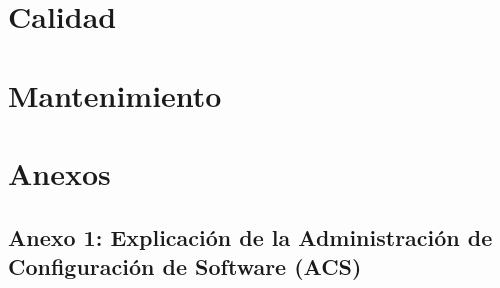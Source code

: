 \documentclass[a4paper,11pt]{report}
\begin{document}
    \chapter{Calidad}\label{ch:calidad}
    

    \chapter{Mantenimiento}\label{ch:mantenimiento}
    

    \chapter*{Anexos}

    \clearpage


    \section*{Anexo 1: Explicación de la Administración de Configuración de Software (ACS)}
\end{document}
